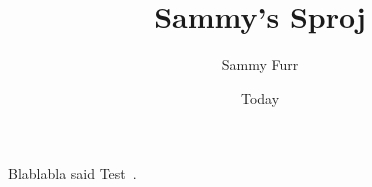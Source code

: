 \documentclass[11pt]{article}
\begin{document}
\title{Sammy's Sproj}
\author{Sammy Furr}
\date{Today}
\maketitle

Blablabla said Test~\cite{DBLP:journals/corr/OCallahanJFHNP17}.

{}

\end{document}
